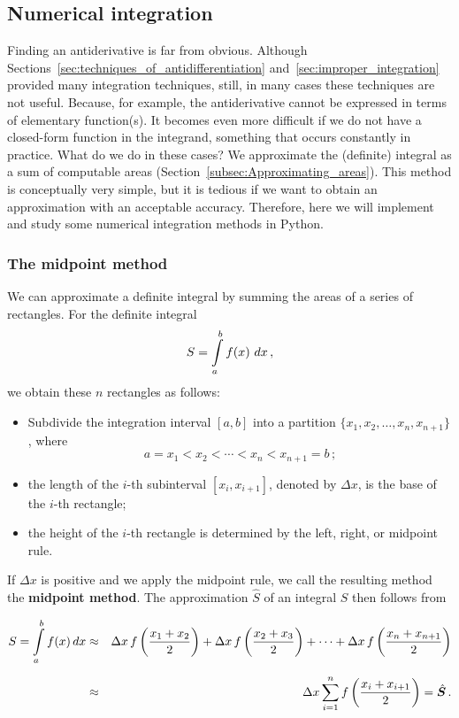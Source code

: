 \subsection{Numerical integration}\label{pc:integratie}
Finding an antiderivative is far from obvious. Although Sections~\ref{sec:techniques_of_antidifferentiation} and~\ref{sec:improper_integration} provided many integration techniques, still, in many cases these techniques are not useful.
Because, for example, the antiderivative cannot be expressed in terms of elementary function(s).
It becomes even more difficult if we do not have a closed-form function in the integrand, something that occurs constantly in practice. What do we do in these cases? We approximate the (definite) integral as a sum of computable areas (Section~\ref{subsec:Approximating_areas}).
This method is conceptually very simple, but it is tedious if we want to obtain an approximation with an acceptable accuracy. Therefore, here we will implement and study some numerical integration methods in Python.
\subsubsection{The midpoint method}\label{pc:integratie_MM}
We can approximate a definite integral by summing the areas of a series of rectangles. For the definite integral $$S = \displaystyle \int\limits_a^b f(x)\ dx\,,$$ we obtain these $n$ rectangles as follows:
\begin{itemize}
	\item Subdivide the integration interval $[a,b]$ into a partition $ \{x_1, x_2, \ldots, x_n, x_{n+1}\}$, where $$a=x_1 < x_2 < \cdots < x_n < x_{n+1}=b\,;$$
	\item the length of the $i$-th subinterval $[x_i,x_{i+1}]$, denoted by $\Delta x$, is the base of the $i$-th rectangle;
	\item the height of the $i$-th rectangle is determined by the left, right, or midpoint rule.
\end{itemize}
If $\Delta x$ is positive and we apply the midpoint rule, we call the resulting method the \textbf{midpoint method}. The approximation $\hat{S}$ of an integral $S$ then follows from

\begin{eqnarray}
S = \ds \int\limits^b_a{f(x)}\,dx &\approx& \Delta x\,f\left(\dfrac{x_1+x_2}{2}\right) + \Delta x\,f\left(\dfrac{x_2+x_3}{2}\right) +\cdots+ \Delta x\,f\left(\dfrac{x_n+x_{n+1}}{2}\right)\notag\\[0.2cm]
&\approx& \Delta x \sum \limits^{n}_{i=1} f\left(\dfrac{x_i+x_{i+1}}{2}\right) = \hat{S}\label{eq:midpoint0}\, .
\end{eqnarray} 

